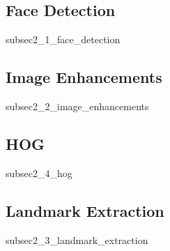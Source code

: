 \subsection{Face Detection}
{subsec2_1_face_detection}

\subsection{Image Enhancements}
{subsec2_2_image_enhancements}

\subsection{HOG}
{subsec2_4_hog}

\subsection{Landmark Extraction}
{subsec2_3_landmark_extraction}
